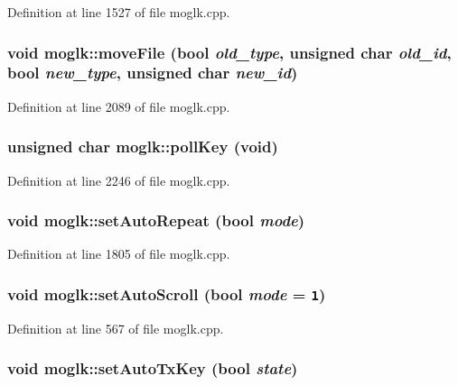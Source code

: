 Definition at line 1527 of file moglk.cpp.\hypertarget{classmoglk_c2bcc785f03c46e32f27486704bd559a}{
\subsubsection[{moveFile}]{\setlength{\rightskip}{0pt plus 5cm}void moglk::moveFile (bool {\em old\_\-type}, \/  unsigned char {\em old\_\-id}, \/  bool {\em new\_\-type}, \/  unsigned char {\em new\_\-id})}}
\label{classmoglk_c2bcc785f03c46e32f27486704bd559a}




Definition at line 2089 of file moglk.cpp.\hypertarget{classmoglk_7892be0a8494f02f08f57981d31932cd}{
\subsubsection[{pollKey}]{\setlength{\rightskip}{0pt plus 5cm}unsigned char moglk::pollKey (void)}}
\label{classmoglk_7892be0a8494f02f08f57981d31932cd}




Definition at line 2246 of file moglk.cpp.\hypertarget{classmoglk_7679c4288b4ff96cf0259dbda8a852e7}{
\subsubsection[{setAutoRepeat}]{\setlength{\rightskip}{0pt plus 5cm}void moglk::setAutoRepeat (bool {\em mode})}}
\label{classmoglk_7679c4288b4ff96cf0259dbda8a852e7}




Definition at line 1805 of file moglk.cpp.\hypertarget{classmoglk_38e9c9bda5fbe192d696ae67246c0bef}{
\subsubsection[{setAutoScroll}]{\setlength{\rightskip}{0pt plus 5cm}void moglk::setAutoScroll (bool {\em mode} = {\tt 1})}}
\label{classmoglk_38e9c9bda5fbe192d696ae67246c0bef}




Definition at line 567 of file moglk.cpp.\hypertarget{classmoglk_60acc221e5d147e977aead13e60b9cc2}{
\subsubsection[{setAutoTxKey}]{\setlength{\rightskip}{0pt plus 5cm}void moglk::setAutoTxKey (bool {\em state})}}
\label{classmoglk_60acc221e5d147e977aead13e60b9cc2}




